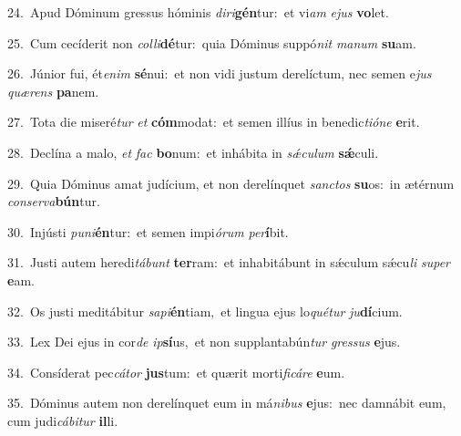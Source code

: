 {\numbfont\textcolor{\numbcolor}{24.}}~Apud Dóminum gressus hóminis \textit{di}\-\textit{ri}\textbf{gén}tur:~\star et vi\textit{am} \textit{e}\-\textit{jus} \textbf{vo}\-let.\par
{\numbfont\textcolor{\numbcolor}{25.}}~Cum cecíderit non \textit{col}\-\textit{li}\textbf{dé}tur:~\star quia Dóminus suppó\textit{nit} \textit{ma}\-\textit{num} \textbf{su}\-am.\par
{\numbfont\textcolor{\numbcolor}{26.}}~Júnior fui, ét\-\textit{e}\-\textit{nim} \textbf{sé}\-nui:~\star et non vidi justum derelíctum, nec semen e\textit{jus} \textit{quæ}\-\textit{rens} \textbf{pa}\-nem.\par
{\numbfont\textcolor{\numbcolor}{27.}}~Tota die miseré\textit{tur} \textit{et} \textbf{cóm}\-modat:~\star et semen illíus in benedic\-\textit{ti}\-\textit{ó}\textit{ne} \textbf{e}\-rit.\par
{\numbfont\textcolor{\numbcolor}{28.}}~Declína a malo, \textit{et} \textit{fac} \textbf{bo}\-num:~\star et inhábita in \textit{sǽ}\-\textit{cu}\textit{lum} \textbf{sǽ}\-culi.\par
{\numbfont\textcolor{\numbcolor}{29.}}~Quia Dóminus amat judícium, et non derelínquet \textit{sanc}\-\textit{tos} \textbf{su}\-os:~\star in ætérnum \textit{con}\-\textit{ser}\textit{va}\textbf{bún}tur.\par
{\numbfont\textcolor{\numbcolor}{30.}}~Injústi \textit{pu}\-\textit{ni}\textbf{én}tur:~\star et semen impi\-\textit{ó}\-\textit{rum} \textit{per}\-\textbf{í}bit.\par
{\numbfont\textcolor{\numbcolor}{31.}}~Justi autem heredi\-\textit{tá}\-\textit{bunt} \textbf{ter}\-ram:~\star et inhabitábunt in sǽculum sǽcu\textit{li} \textit{su}\-\textit{per} \textbf{e}\-am.\par
{\numbfont\textcolor{\numbcolor}{32.}}~Os justi meditábitur \textit{sa}\-\textit{pi}\textbf{én}tiam,~\star et lingua ejus lo\-\textit{qué}\-\textit{tur} \textit{ju}\-\textbf{dí}cium.\par
{\numbfont\textcolor{\numbcolor}{33.}}~Lex Dei ejus in cor\textit{de} \textit{ip}\-\textbf{sí}us,~\star et non supplantabún\textit{tur} \textit{gres}\-\textit{sus} \textbf{e}\-jus.\par
{\numbfont\textcolor{\numbcolor}{34.}}~Consíderat pec\-\textit{cá}\-\textit{tor} \textbf{jus}\-tum:~\star et quærit morti\-\textit{fi}\-\textit{cá}\textit{re} \textbf{e}\-um.\par
{\numbfont\textcolor{\numbcolor}{35.}}~Dóminus autem non derelínquet eum in má\-\textit{ni}\-\textit{bus} \textbf{e}\-jus:~\star nec damnábit eum, cum judi\-\textit{cá}\-\textit{bi}\textit{tur} \textbf{il}\-li.\par

